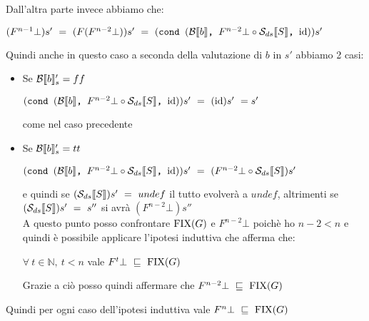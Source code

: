 {\begin{itemize}
\begin{itemize}
			Dall'altra parte invece abbiamo che:
			\begin{center}
			$(F^{n-1}\bot{})s'~=~(F(F^{n-2}\bot{}))s'~=~
			(\cond{b}{F^{n-2}\bot{} \circ \Sds{}}{\idDS})s'$
			\end{center}
			Quindi anche in questo caso a seconda della valutazione di $b$ in
			$s'$ abbiamo 2 casi:
			\begin{itemize}
			\item Se $\evalBbs{b}{s'}=ff$
			\begin{center}
			$(\cond{b}{F^{n-2}\bot{} \circ \Sds{}}{\idDS})s'~=~(\idDS)s'~=s'$
			\end{center}
			come nel caso precedente
			\item Se $\evalBbs{b}{s'}=tt$
			\begin{center}
			$(\cond{b}{F^{n-2}\bot{} \circ \Sds{}}{\idDS})s'~=~
			(F^{n-2}\bot{} \circ \Sds{})s'$
			\end{center}
			e quindi se $(\Sds{})s'~=~undef$ il tutto evolverà a $undef$,
			altrimenti se $(\Sds{})s'~=~s''$ si avrà $(F^{n-2}\bot{})s''$\\
			A questo punto posso confrontare $\fixp{G}$ e $F^{n-2}\bot{}$ 
			poichè ho $n-2<n$ e quindi è possibile applicare l'ipotesi 
			induttiva che afferma che:
			\begin{center}
			$\forall~t\in\mathbb{N},~t<n$ vale $F^{t}\bot~\mineq~\fixp{G}$
			\end{center}
			Grazie a ciò posso quindi affermare che 
			$F^{n-2}\bot{}~\mineq~\fixp{G}$
			\end{itemize}
		\end{itemize}
	\end{itemize}
	Quindi per ogni caso dell'ipotesi induttiva vale 
	$F^{n}\bot{}~\mineq~\fixp{G}$
}
\newpage